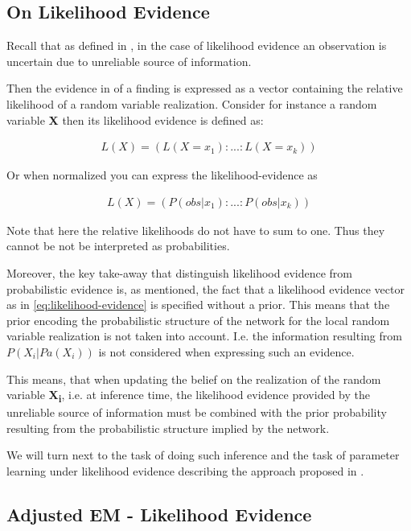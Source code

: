 \documentclass[11pt]{article}
\begin{document}
\begin{article}
\newpage

\section{On Likelihood Evidence}
\label{likelihood-em}
Recall that as defined in \cite{Mrad_2015}, in the case of
likelihood evidence an observation is uncertain due to unreliable
source of information.

Then the evidence in of a finding is expressed as a vector
containing the relative likelihood of a random variable
realization. Consider for instance a random variable \textbf{X} then its
likelihood evidence is defined as:

\begin{align} \label{eq:likelihood-evidence}
 L(X) = (L(X = x_1): ... : L(X = x_k))
\end{align}

Or when normalized you can express the likelihood-evidence as 

\begin{align} \label{eq:normalized-likelihood-evidence}
 L(X) = (P(obs | x_1): ... : P(obs | x_k))
\end{align}

Note that here the relative likelihoods do not have to sum to
one. Thus they cannot be not be interpreted as probabilities.

Moreover, the key take-away that distinguish likelihood evidence
from probabilistic evidence is, as mentioned, the fact that a
likelihood evidence vector as in \ref{eq:likelihood-evidence} is
specified without a prior. This means that the prior encoding the
probabilistic structure of the network for the local random
variable realization is not taken into account. I.e. the
information resulting from \(P(X_i|Pa(X_i))\) is not considered when
expressing such an evidence.

This means, that when updating the belief on the realization of
the random variable \textbf{X\textsubscript{i}}, i.e. at inference time, the likelihood
evidence provided by the unreliable source of information must be
combined with the prior probability resulting from the
probabilistic structure implied by the network.

We will turn next to the task of doing such inference and the task
of parameter learning under likelihood evidence describing the
approach proposed in \cite{Wasserkrug_all}.

\subsection{Adjusted EM - Likelihood Evidence}
\label{sec:org35cb49b}


\end{article}
\end{document}
